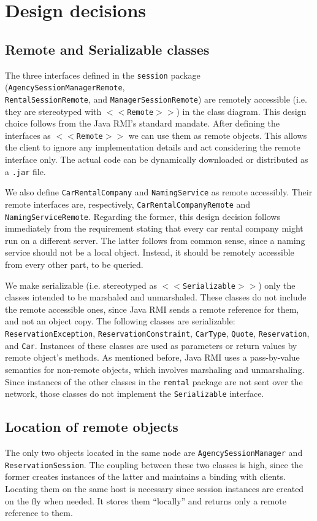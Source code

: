 \section{Design decisions}
\subsection{Remote and Serializable classes}
The three interfaces defined in the \texttt{session} package (\texttt{AgencySessionManagerRemote}, \\\texttt{RentalSessionRemote}, and \texttt{ManagerSessionRemote}) are remotely accessible (i.e. they are stereotyped with \texttt{$<<$Remote$>>$}) in the class diagram. This design choice follows from the Java RMI's standard mandate. After defining the interfaces as \texttt{$<<$Remote$>>$} we can use them as remote objects. This allows the client to ignore any implementation details and act considering the remote interface only. The actual code can be dynamically downloaded or distributed as a \texttt{.jar} file.

We also define \texttt{CarRentalCompany} and \texttt{NamingService} as remote accessibly. Their remote interfaces are, respectively, \texttt{CarRentalCompanyRemote} and \texttt{NamingServiceRemote}. Regarding the former, this design decision follows immediately from the requirement stating that every car rental company might run on a different server. The latter follows from common sense, since a naming service should not be a local object. Instead, it should be remotely accessible from every other part, to be queried.

We make serializable (i.e. stereotyped as \texttt{$<<$Serializable$>>$}) only the classes intended to be marshaled and unmarshaled. These classes do not include the remote accessible ones, since Java RMI sends a remote reference for them, and not an object copy. The following classes are serializable: \texttt{ReservationException}, \texttt{ReservationConstraint}, \texttt{CarType}, \texttt{Quote}, \texttt{Reservation}, and \texttt{Car}. Instances of these classes are used as parameters or return values by remote object's methods. As mentioned before, Java RMI uses a pass-by-value semantics for non-remote objects, which involves marshaling and unmarshaling. Since instances of the other classes in the \texttt{rental} package are not sent over the network, those classes do not implement the \texttt{Serializable} interface. 

\subsection{Location of remote objects}
The only two objects located in the same node are \texttt{AgencySessionManager} and \texttt{ReservationSession}. The coupling between these two classes is high, since the former creates instances of the latter and maintains a binding with clients. Locating them on the same host is necessary since session instances are created on the fly when needed. It stores them ``locally'' and returns only a remote reference to them. 

